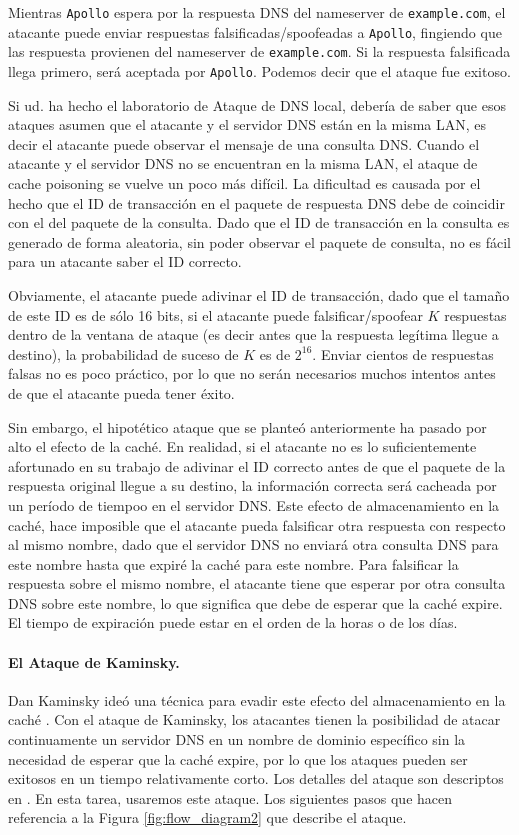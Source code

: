 Mientras {\tt Apollo} espera por la respuesta DNS del nameserver de  {\tt example.com}, el atacante puede enviar respuestas falsificadas/spoofeadas a {\tt Apollo}, fingiendo que las respuesta provienen del nameserver de {\tt example.com}. Si la respuesta falsificada llega primero, será aceptada por {\tt Apollo}. Podemos decir que el ataque fue exitoso.

Si ud. ha hecho el laboratorio de Ataque de DNS local, debería de saber que esos ataques asumen que el atacante y el servidor DNS están en la misma LAN, es decir el atacante puede observar el mensaje de una consulta DNS.
Cuando el atacante y el servidor DNS no se encuentran en la misma LAN, el ataque de cache poisoning se vuelve un poco más difícil.
La dificultad es causada por el hecho que el ID de transacción en el paquete de respuesta DNS debe de coincidir con el del paquete de la consulta. Dado que el ID de transacción en la consulta es generado de forma aleatoria, sin poder observar el paquete de consulta, no es fácil para un atacante saber el ID correcto.

Obviamente, el atacante puede adivinar el ID de transacción, dado que el tamaño de este ID es de sólo 16 bits, si el atacante puede falsificar/spoofear $K$ respuestas dentro de la ventana de ataque (es decir antes que la respuesta legítima llegue a destino), la probabilidad de suceso de $K$ es de $2^{16}$. 
Enviar cientos de respuestas falsas no es poco práctico, por lo que
no serán necesarios muchos intentos antes de que el atacante pueda tener éxito.

Sin embargo, el hipotético ataque que se planteó anteriormente ha pasado por alto el efecto de la caché.
En realidad, si el atacante no es lo suficientemente afortunado en su trabajo de adivinar el ID correcto antes de que el paquete de la respuesta original llegue a su destino, la información correcta será cacheada por un período de tiempoo en el servidor DNS. Este efecto de almacenamiento en la caché, hace imposible que el atacante pueda falsificar otra respuesta con respecto al mismo nombre, dado que el servidor DNS no enviará otra consulta DNS para este nombre hasta que expiré la caché para este nombre.
Para falsificar la respuesta sobre el mismo nombre, el atacante tiene que esperar por otra consulta DNS sobre este nombre, lo que significa que debe de esperar que la caché expire. El tiempo de expiración puede estar en el orden de la horas o de los días.


\paragraph{El Ataque de Kaminsky.} 
Dan Kaminsky ideó una técnica para evadir este efecto del almacenamiento en la caché \cite{dns:Kaminsky}.
Con el ataque de Kaminsky, los atacantes tienen la posibilidad de atacar continuamente un servidor DNS en un nombre de dominio específico sin la necesidad de esperar que la caché expire, por lo que los ataques pueden ser exitosos en un tiempo relativamente corto. 
Los detalles del ataque son descriptos en \cite{dns:Kaminsky,seedbook}. 
En esta tarea, usaremos este ataque. Los siguientes pasos que hacen referencia a la Figura \ref{fig:flow_diagram2} que describe el ataque.


